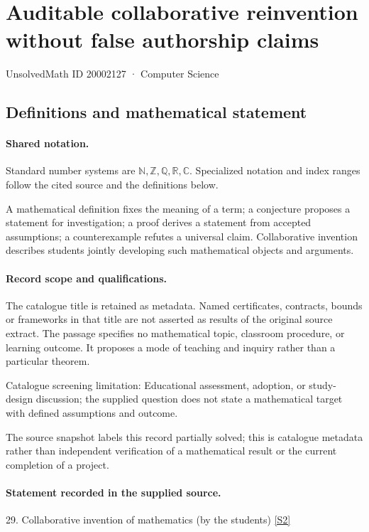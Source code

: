 \documentclass[11pt]{article}
\newcommand{\sref}[2]{\hyperlink{source:#1:#2}{[S#2]}}
\begin{document}
\setcounter{section}{20002126}
\section{Auditable collaborative reinvention without false authorship claims}\label{20002127}
{\small\sffamily UnsolvedMath ID 20002127 · Computer Science}
\subsection{Definitions and mathematical statement}

\paragraph{Shared notation.}Standard number systems are $\mathbb N,\mathbb Z,\mathbb Q,\mathbb R,\mathbb C$. Specialized notation and index ranges follow the cited source and the definitions below.


A mathematical definition fixes the meaning of a term; a conjecture proposes a statement for investigation; a proof derives a statement from accepted assumptions; a counterexample refutes a universal claim. Collaborative invention describes students jointly developing such mathematical objects and arguments.
\paragraph{Record scope and qualifications.}
The catalogue title is retained as metadata. Named certificates, contracts, bounds or frameworks in that title are not asserted as results of the original source extract.
The passage specifies no mathematical topic, classroom procedure, or learning outcome. It proposes a mode of teaching and inquiry rather than a particular theorem.

Catalogue screening limitation: Educational assessment, adoption, or study-design discussion; the supplied question does not state a mathematical target with defined assumptions and outcome.

The source snapshot labels this record partially solved; this is catalogue metadata rather than independent verification of a mathematical result or the current completion of a project.
\paragraph{Statement recorded in the supplied source.}
29. Collaborative invention of mathematics (by the students) \sref{20002127}{2}
\end{document}
